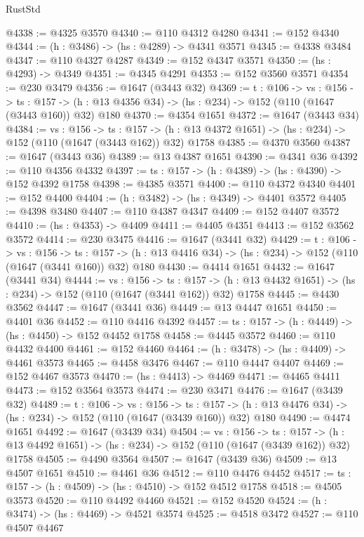 \begin{lexlean}{RustStd}
\begin{coremodule}
@4338 := @4325 @3570
@4340 := @110 @4312 @4280
@4341 := @152 @4340
@4344 := (h : @3486) -> (hs : @4289) -> @4341 @3571
@4345 := @4338 @3484
@4347 := @110 @4327 @4287
@4349 := @152 @4347 @3571
@4350 := (hs : @4293) -> @4349
@4351 := @4345 @4291
@4353 := @152 @3560 @3571
@4354 := @230 @3479
@4356 := @1647 (@3443 @32)
@4369 := {t : @106} ->
  {vs : @156} ->
  {ts : @157} -> (h : @13 @4356 @34) -> (hs : @234) -> @152 (@110 (@1647 (@3443 @160)) @32) @180
@4370 := @4354 @1651
@4372 := @1647 (@3443 @34)
@4384 := {vs : @156} ->
  {ts : @157} -> (h : @13 @4372 @1651) -> (hs : @234) -> @152 (@110 (@1647 (@3443 @162)) @32) @1758
@4385 := @4370 @3560
@4387 := @1647 (@3443 @36)
@4389 := @13 @4387 @1651
@4390 := @4341 @36
@4392 := @110 @4356 @4332
@4397 := {ts : @157} -> (h : @4389) -> (hs : @4390) -> @152 @4392 @1758
@4398 := @4385 @3571
@4400 := @110 @4372 @4340
@4401 := @152 @4400
@4404 := (h : @3482) -> (hs : @4349) -> @4401 @3572
@4405 := @4398 @3480
@4407 := @110 @4387 @4347
@4409 := @152 @4407 @3572
@4410 := (hs : @4353) -> @4409
@4411 := @4405 @4351
@4413 := @152 @3562 @3572
@4414 := @230 @3475
@4416 := @1647 (@3441 @32)
@4429 := {t : @106} ->
  {vs : @156} ->
  {ts : @157} -> (h : @13 @4416 @34) -> (hs : @234) -> @152 (@110 (@1647 (@3441 @160)) @32) @180
@4430 := @4414 @1651
@4432 := @1647 (@3441 @34)
@4444 := {vs : @156} ->
  {ts : @157} -> (h : @13 @4432 @1651) -> (hs : @234) -> @152 (@110 (@1647 (@3441 @162)) @32) @1758
@4445 := @4430 @3562
@4447 := @1647 (@3441 @36)
@4449 := @13 @4447 @1651
@4450 := @4401 @36
@4452 := @110 @4416 @4392
@4457 := {ts : @157} -> (h : @4449) -> (hs : @4450) -> @152 @4452 @1758
@4458 := @4445 @3572
@4460 := @110 @4432 @4400
@4461 := @152 @4460
@4464 := (h : @3478) -> (hs : @4409) -> @4461 @3573
@4465 := @4458 @3476
@4467 := @110 @4447 @4407
@4469 := @152 @4467 @3573
@4470 := (hs : @4413) -> @4469
@4471 := @4465 @4411
@4473 := @152 @3564 @3573
@4474 := @230 @3471
@4476 := @1647 (@3439 @32)
@4489 := {t : @106} ->
  {vs : @156} ->
  {ts : @157} -> (h : @13 @4476 @34) -> (hs : @234) -> @152 (@110 (@1647 (@3439 @160)) @32) @180
@4490 := @4474 @1651
@4492 := @1647 (@3439 @34)
@4504 := {vs : @156} ->
  {ts : @157} -> (h : @13 @4492 @1651) -> (hs : @234) -> @152 (@110 (@1647 (@3439 @162)) @32) @1758
@4505 := @4490 @3564
@4507 := @1647 (@3439 @36)
@4509 := @13 @4507 @1651
@4510 := @4461 @36
@4512 := @110 @4476 @4452
@4517 := {ts : @157} -> (h : @4509) -> (hs : @4510) -> @152 @4512 @1758
@4518 := @4505 @3573
@4520 := @110 @4492 @4460
@4521 := @152 @4520
@4524 := (h : @3474) -> (hs : @4469) -> @4521 @3574
@4525 := @4518 @3472
@4527 := @110 @4507 @4467

\end{coremodule}
\end{lexlean}

